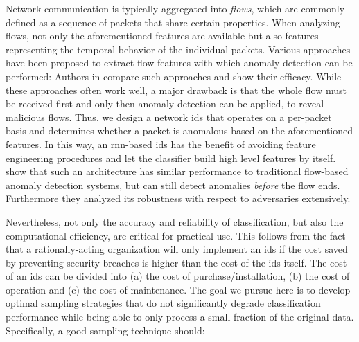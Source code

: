 \documentclass[conference]{IEEEtran}
\begin{document}
Network communication is typically aggregated into \textit{flows}, which are commonly defined as a sequence of packets that share certain properties. When analyzing flows, not only the aforementioned features are available but also features representing the temporal behavior of the individual packets. Various approaches have been proposed to extract flow features with which anomaly detection can be performed: Authors in \cite{meghdouri_analysis_2018} compare such approaches and show their efficacy.
While these approaches often work well, a major drawback is that the whole flow must be received first and only then anomaly detection can be applied, to reveal malicious flows. Thus, we design a network \gls{ids} that operates on a per-packet basis and determines whether a packet is anomalous based on the aforementioned features.
In this way, an \gls{rnn}-based \gls{ids} has the benefit of avoiding feature engineering procedures and let the classifier build high level features by itself.
\cite{hartl_explainability_2019} show that such an architecture has similar performance to traditional flow-based anomaly detection systems, but can still detect anomalies \textit{before} the flow ends. Furthermore they analyzed its robustness with respect to adversaries extensively.


Nevertheless, not only the accuracy and reliability of classification, but also the computational efficiency, are critical for practical use. This follows from the fact that a rationally-acting organization will only implement an \gls{ids} if the cost saved by preventing security breaches is higher than the cost of the \gls{ids} itself. The cost of an \gls{ids} can be divided into (a) the cost of purchase/installation, (b) the cost of operation and (c) the cost of maintenance. The goal we pursue here is to develop optimal sampling strategies that do not significantly degrade classification performance while being able to only process a small fraction of the original data. Specifically, a good sampling technique should:
\end{document}
